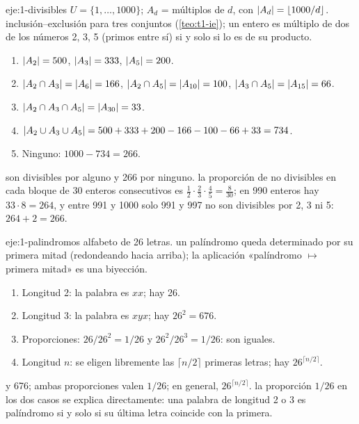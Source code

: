 \begin{solucion}{eje:1-divisibles}
\datos $U=\{1,\dots,1000\}$; $A_d$ = múltiplos de $d$, con $\lvert A_d\rvert=\lfloor1000/d\rfloor$.
\planteamiento inclusión--exclusión para tres conjuntos (\cref{teo:t1-ie}); un entero es múltiplo de dos de los números 2, 3, 5 (primos entre sí) si y solo si lo es de su producto.
\pasos
\begin{enumerate}[label=\arabic*.]
  \item $\lvert A_2\rvert=500$, $\lvert A_3\rvert=333$, $\lvert A_5\rvert=200$.
  \item $\lvert A_2\cap A_3\rvert=\lvert A_6\rvert=166$, $\lvert A_2\cap A_5\rvert=\lvert A_{10}\rvert=100$, $\lvert A_3\cap A_5\rvert=\lvert A_{15}\rvert=66$.
  \item $\lvert A_2\cap A_3\cap A_5\rvert=\lvert A_{30}\rvert=33$.
  \item $\lvert A_2\cup A_3\cup A_5\rvert=500+333+200-166-100-66+33=734$.
  \item Ninguno: $1000-734=266$.
\end{enumerate}
 son divisibles por alguno y 266 por ninguno.
\comprobacion la proporción de no divisibles en cada bloque de 30 enteros consecutivos es $\frac12\cdot\frac23\cdot\frac45=\frac{8}{30}$; en 990 enteros hay $33\cdot8=264$, y entre 991 y 1000 solo 991 y 997 no son divisibles por 2, 3 ni 5: $264+2=266$.
\end{solucion}

\begin{solucion}{eje:1-palindromos}
\datos alfabeto de 26 letras.
\planteamiento un palíndromo queda determinado por su primera mitad (redondeando hacia arriba); la aplicación «palíndromo $\mapsto$ primera mitad» es una biyección.
\pasos
\begin{enumerate}[label=\arabic*.]
  \item Longitud 2: la palabra es $xx$; hay 26.
  \item Longitud 3: la palabra es $xyx$; hay $26^{2}=676$.
  \item Proporciones: $26/26^{2}=1/26$ y $26^{2}/26^{3}=1/26$: son iguales.
  \item Longitud $n$: se eligen libremente las $\lceil n/2\rceil$ primeras letras; hay $26^{\lceil n/2\rceil}$.
\end{enumerate}
 y 676; ambas proporciones valen $1/26$; en general, $26^{\lceil n/2\rceil}$.
\comprobacion la proporción $1/26$ en los dos casos se explica directamente: una palabra de longitud 2 o 3 es palíndromo si y solo si su última letra coincide con la primera.
\end{solucion}

